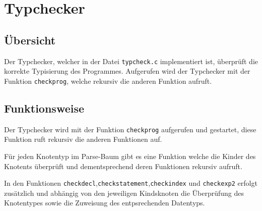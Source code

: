 \chapter{Typchecker}
\label{chap:typcheck}

\section{Übersicht}
\label{sec:typcheck_overview}
Der Typchecker, welcher in der Datei \texttt{typcheck.c} implementiert ist,
überprüft die korrekte Typisierung des Programmes. 
Aufgerufen wird der Typchecker mit der Funktion \texttt{checkprog}, welche rekursiv die
anderen Funktion aufruft.

\section{Funktionsweise}
\label{sec:typcheck_func}

Der Typchecker wird mit der Funktion \texttt{checkprog} aufgerufen und gestartet, diese Funktion
ruft rekursiv die anderen Funktionen auf.

Für jeden Knotentyp im Parse-Baum gibt es eine Funktion welche die Kinder des Knotents überprüft und dementsprechend deren Funktionen rekursiv aufruft.

In den Funktionen \texttt{checkdecl},\texttt{checkstatement},\texttt{checkindex} und \texttt{checkexp2} erfolgt zusätzlich und abhängig von den jeweiligen Kindsknoten die Überprüfung des Knotentypes sowie die Zuweisung des entpsrechenden Datentyps.